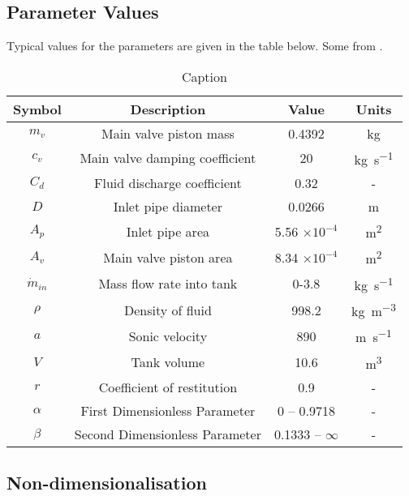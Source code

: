 \subsection{Parameter Values}

Typical values for the parameters are given in the table below. Some from \cite{Hos2016DynamicService}.

\begin{table}[ht]
    \centering
    \begin{tabular}{c|c|c|c}
        Symbol & Description & Value & Units \\ \hline \hline
        $m_v$ & Main valve piston mass & 0.4392 & \si{kg} \\ \hline %
        $c_v$ & Main valve damping coefficient & 20 & \si{kg.s^{-1}} \\ \hline %
        $C_d$ & Fluid discharge coefficient & 0.32 & - \\ \hline %
        $D$ & Inlet pipe diameter & 0.0266 & \si{m} \\ \hline %
        $A_p$ & Inlet pipe area & 5.56 $\times 10^{-4}$ & \si{m^2} \\ \hline
        $A_v$ & Main valve piston area & 8.34 $\times 10^{-4}$ & \si{m^2} \\ \hline
        $\dot{m}_{in}$ & Mass flow rate into tank & 0-3.8 & \si{kg.s^{-1}} \\ \hline %
        $\rho$ & Density of fluid & 998.2 & \si{kg.m^{-3}} \\ \hline %
        $a$ & Sonic velocity & 890 & \si{m.s^{-1}} \\ \hline %
        $V$ & Tank volume & 10.6 & \si{m^3} \\ \hline %
        $r$ & Coefficient of restitution & 0.9 & - \\ \hline \hline %
        $\alpha$ & First Dimensionless Parameter & 0 -- 0.9718 & - \\ \hline
        $\beta$ & Second Dimensionless Parameter & 0.1333 -- $\infty$ & - \\ %
    \end{tabular}
    \caption{Caption}
    \label{tab:my_label}
\end{table}

\subsection{Non-dimensionalisation}

